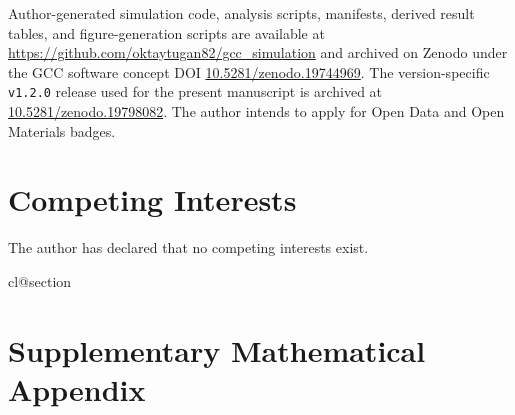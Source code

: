 \documentclass[11pt,a4paper]{article}
\theoremstyle{plain}
\theoremstyle{definition}
\theoremstyle{remark}
\begin{document}
Author-generated simulation code, analysis scripts, manifests, derived result tables, and figure-generation scripts are available at \url{https://github.com/oktaytugan82/gcc_simulation} and archived on Zenodo under the GCC software concept DOI \href{https://doi.org/10.5281/zenodo.19744969}{10.5281/zenodo.19744969}. The version-specific \texttt{v1.2.0} release used for the present manuscript is archived at \href{https://doi.org/10.5281/zenodo.19798082}{10.5281/zenodo.19798082}. The author intends to apply for Open Data and Open Materials badges.

\section*{Competing Interests}

The author has declared that no competing interests exist.

\appendix
\makeatletter
\providecommand*{\@removefromreset}[2]{%
  \let\@tempa\@elt
  \let\@elt\relax
  \expandafter\let\expandafter\@tempb\csname cl@#2\endcsname
  \expandafter\def\csname cl@#2\endcsname{}%
  \def\@elt##1{%
    \ifx ##1#1\else
      \expandafter\@temptokena\expandafter{\csname cl@#2\endcsname}%
      \edef\x{\noexpand\expandafter\noexpand\def\noexpand\csname cl@#2\noexpand\endcsname{\the\@temptokena \noexpand\@elt{##1}}}\x
    \fi}%
  \@tempb
  \let\@elt\@tempa}
\@removefromreset{theorem}{section}
\makeatother
\section*{Supplementary Mathematical Appendix}
\label{sec:appendix}
\setcounter{section}{0}
\setcounter{theorem}{0}
\renewcommand{\thesection}{A.\arabic{section}}
\renewcommand{\thesubsection}{A.\arabic{section}.\arabic{subsection}}
\renewcommand{\thetheorem}{A.\arabic{theorem}}

\titleformat{\section}{\large\bfseries}{\thesection}{0.6em}{}
\titlespacing*{\section}{0pt}{1.5em}{0.8em}
\end{document}
